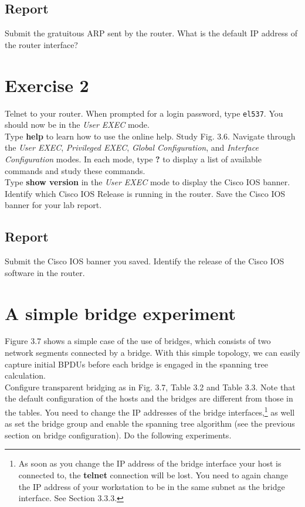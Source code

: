 \documentclass[10pt,a4paper]{article}
\numberwithin{equation}{section}
\numberwithin{figure}{section}
\numberwithin{table}{section}
\begin{document}
    \subsection*{Report}
    Submit the gratuitous ARP sent by the router. What is the default IP address of the router interface? \\


    \section{ Exercise 2}
    Telnet to your router. When prompted for a login password, type \texttt{el537}.
    You should now be in the \textit{User EXEC} mode. \\
    Type \textbf{help} to learn how to use the online help.
    Study Fig. 3.6. Navigate through the \textit{User EXEC}, \textit{Privileged EXEC}, \textit{Global Configuration}, and \textit{Interface Configuration} modes. In each mode, type \textbf{?} to display a list of available commands and study these commands. \\
    Type \textbf{show version} in the \textit{User EXEC} mode to display the Cisco IOS banner.
    Identify which Cisco IOS Release is running in the router.
    Save the Cisco IOS banner for your lab report.
    \subsection*{Report}
    Submit the Cisco IOS banner you saved.
    Identify the release of the Cisco IOS software in the router.

    \section*{A simple bridge experiment}
    Figure 3.7 shows a simple case of the use of bridges, which consists of two network segments connected by a bridge.
    With this simple topology, we can easily capture initial BPDUs before each bridge is engaged in the spanning tree calculation. \\
    Configure transparent bridging as in Fig.
    3.7, Table 3.2 and Table 3.3.
    Note that the default configuration of the hosts and the bridges are different from those in the tables.
    You need to change the IP addresses of the bridge interfaces,\footnote{As soon as you change the IP address of the bridge interface your host is connected to, the \textbf{telnet} connection will be lost.
    You need to again change the IP address of your workstation to be in the same subnet as the bridge interface. See Section 3.3.3.} as well as set the bridge group and enable the spanning tree algorithm (see the previous section on bridge configuration).
    Do the following experiments.
\end{document}
